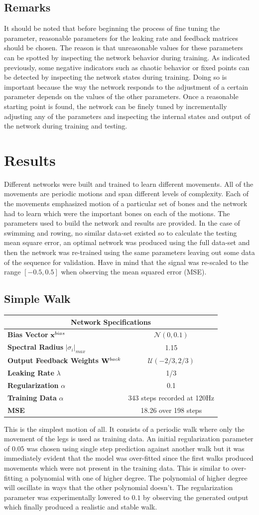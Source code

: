 \documentclass[letterpaper,9pt]{article}
\newcommand{\networkSpecs}[7]{
  \begin{center}
  \begin{tabular}{ | l | c | }
    \hline
    \multicolumn{2}{|c|}{{\bf Network Specifications}} \\
    \hline
    {\bf Bias Vector} ${\bf x}^{bias}$ & $\mathcal{N}(#1)$ \\
    \hline
    {\bf Spectral Radius} $|\sigma_i|_{max}$ & #2 \\
    \hline
    {\bf Output Feedback Weights} ${\bf W}^{back}$ & $\mathcal{U}(#3)$ \\
    \hline
    {\bf Leaking Rate} $\lambda$ & #4 \\
    \hline
    {\bf Regularization} $\alpha$ & #5\\
    \hline
    {\bf Training Data} $\alpha$ & #6\\
    \hline
    {\bf MSE} & #7\\
    \hline
  \end{tabular}    
  \end{center}
}
\begin{document}
\subsection{Remarks}

It should be noted that before beginning the process of fine tuning the parameter, reasonable parameters for the leaking rate and feedback matrices should be chosen. The reason is that unreasonable values for these parameters can be spotted by inspecting the network behavior during training. As indicated previously, some negative indicators such as chaotic behavior or fixed points can be detected by inspecting the network states during training. Doing so is important because the way the network responds to the adjustment of a certain parameter depends on the values of the other parameters. Once a reasonable starting point is found, the network can be finely tuned by incrementally adjusting any of the parameters and inspecting the internal states and output of the network during training and testing.

\section{Results}

Different networks were built and trained to learn different movements. All of the movements are periodic motions and span different levels of complexity. Each of the movements emphasized motion of a particular set of bones and the network had to learn which were the important bones on each of the motions. The parameters used to build the network and results are provided. In the case of swimming and rowing, no similar data-set existed so to calculate the testing mean square error, an optimal network was produced using the full data-set and then the network was re-trained using the same parameters leaving out some data of the sequence for validation. Have in mind that the signal was re-scaled to the range $[-0.5,0.5]$ when observing the mean squared error (MSE).

\subsection{Simple Walk}

\networkSpecs{0,0.1}
             {1.15}
             {-2/3,2/3}
             {1/3}
             {0.1}
             {343 steps recorded at 120Hz}
             {18.26 over 198 steps}


This is the simplest motion of all. It consists of a periodic walk where only the movement of the legs is used as training data. An initial regularization parameter of $0.05$ was chosen using single step prediction against another walk but it was immediately evident that the model was over-fitted since the first walks produced movements which were not present in the training data. This is similar to over-fitting a polynomial with one of higher degree. The polynomial of higher degree will oscillate in ways that the other polynomial doesn't. The regularization parameter was experimentally lowered to $0.1$ by observing the generated output which finally produced a realistic and stable walk.\pagebreak
\end{document}
